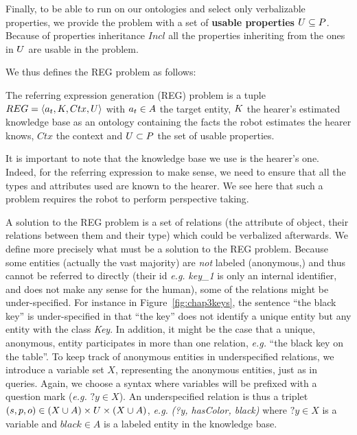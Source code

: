 \documentclass[a4paper,11pt,twoside]{StyleThese}
\begin{document}
Finally, to be able to run on our ontologies and select only verbalizable properties, we provide the problem with a set of \textbf{usable properties} $U \subseteq P$. Because of properties inheritance $Incl$ all the properties inheriting from the ones in $U$ are usable in the problem.

We thus defines the REG problem as follows:
\begin{definition}
The referring expression generation (REG) problem is a tuple $REG = \langle a_t, K, Ctx, U \rangle$ with $a_t \in A$ the target entity, $K$ the hearer's estimated knowledge base as an ontology containing the facts the robot estimates the hearer knows, $Ctx$ the context and $U \subset P$ the set of usable properties.
\end{definition}
It is important to note that the knowledge base we use is the hearer's one. Indeed, for the referring expression to make sense, we need to ensure that all the types and attributes used are known to the hearer. We see here that such a problem requires the robot to perform perspective taking.

A solution to the REG problem is a set of relations (the attribute of object, their relations between them and their type) which could be verbalized afterwards. We define more precisely what must be a solution to the REG problem.
Because some entities (actually the vast majority) are \textit{not} labeled (anonymous,) and thus cannot be referred to directly (their id \textit{e.g.} \textit{key\_1} is only an internal identifier, and does not make any sense for the human), some of the relations might be under-specified. For instance in Figure~\ref{fig:chap3keys}, the sentence ``the black key'' is under-specified in that ``the key'' does not identify a unique entity but any entity with the class \textit{Key}.
In addition, it might be the case that a unique, anonymous, entity participates in more than one relation, \textit{e.g.} ``the black key on the table''. 
To keep track of anonymous entities in underspecified relations, we introduce a variable set $X$, representing the anonymous entities, just as in \sparql{} queries. Again, we choose a syntax where variables will be prefixed with a question mark (\textit{e.g.} $?y \in X$).
An underspecified relation is thus a triplet $(s, p, o) \in (X \cup A) \times U \times (X \cup A)$, \textit{e.g.} \textit{(?y, hasColor, black)} where $?y \in X$ is a variable and $black \in A$ is a labeled entity in the knowledge base.
\end{document}
